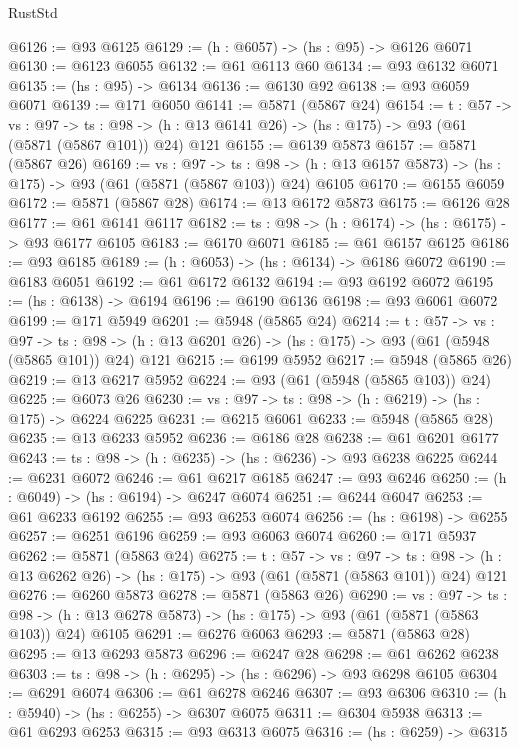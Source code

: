 \begin{lexlean}{RustStd}
\begin{coremodule}
@6126 := @93 @6125
@6129 := (h : @6057) -> (hs : @95) -> @6126 @6071
@6130 := @6123 @6055
@6132 := @61 @6113 @60
@6134 := @93 @6132 @6071
@6135 := (hs : @95) -> @6134
@6136 := @6130 @92
@6138 := @93 @6059 @6071
@6139 := @171 @6050
@6141 := @5871 (@5867 @24)
@6154 := {t : @57} ->
  {vs : @97} ->
  {ts : @98} -> (h : @13 @6141 @26) -> (hs : @175) -> @93 (@61 (@5871 (@5867 @101)) @24) @121
@6155 := @6139 @5873
@6157 := @5871 (@5867 @26)
@6169 := {vs : @97} ->
  {ts : @98} -> (h : @13 @6157 @5873) -> (hs : @175) -> @93 (@61 (@5871 (@5867 @103)) @24) @6105
@6170 := @6155 @6059
@6172 := @5871 (@5867 @28)
@6174 := @13 @6172 @5873
@6175 := @6126 @28
@6177 := @61 @6141 @6117
@6182 := {ts : @98} -> (h : @6174) -> (hs : @6175) -> @93 @6177 @6105
@6183 := @6170 @6071
@6185 := @61 @6157 @6125
@6186 := @93 @6185
@6189 := (h : @6053) -> (hs : @6134) -> @6186 @6072
@6190 := @6183 @6051
@6192 := @61 @6172 @6132
@6194 := @93 @6192 @6072
@6195 := (hs : @6138) -> @6194
@6196 := @6190 @6136
@6198 := @93 @6061 @6072
@6199 := @171 @5949
@6201 := @5948 (@5865 @24)
@6214 := {t : @57} ->
  {vs : @97} ->
  {ts : @98} -> (h : @13 @6201 @26) -> (hs : @175) -> @93 (@61 (@5948 (@5865 @101)) @24) @121
@6215 := @6199 @5952
@6217 := @5948 (@5865 @26)
@6219 := @13 @6217 @5952
@6224 := @93 (@61 (@5948 (@5865 @103)) @24)
@6225 := @6073 @26
@6230 := {vs : @97} -> {ts : @98} -> (h : @6219) -> (hs : @175) -> @6224 @6225
@6231 := @6215 @6061
@6233 := @5948 (@5865 @28)
@6235 := @13 @6233 @5952
@6236 := @6186 @28
@6238 := @61 @6201 @6177
@6243 := {ts : @98} -> (h : @6235) -> (hs : @6236) -> @93 @6238 @6225
@6244 := @6231 @6072
@6246 := @61 @6217 @6185
@6247 := @93 @6246
@6250 := (h : @6049) -> (hs : @6194) -> @6247 @6074
@6251 := @6244 @6047
@6253 := @61 @6233 @6192
@6255 := @93 @6253 @6074
@6256 := (hs : @6198) -> @6255
@6257 := @6251 @6196
@6259 := @93 @6063 @6074
@6260 := @171 @5937
@6262 := @5871 (@5863 @24)
@6275 := {t : @57} ->
  {vs : @97} ->
  {ts : @98} -> (h : @13 @6262 @26) -> (hs : @175) -> @93 (@61 (@5871 (@5863 @101)) @24) @121
@6276 := @6260 @5873
@6278 := @5871 (@5863 @26)
@6290 := {vs : @97} ->
  {ts : @98} -> (h : @13 @6278 @5873) -> (hs : @175) -> @93 (@61 (@5871 (@5863 @103)) @24) @6105
@6291 := @6276 @6063
@6293 := @5871 (@5863 @28)
@6295 := @13 @6293 @5873
@6296 := @6247 @28
@6298 := @61 @6262 @6238
@6303 := {ts : @98} -> (h : @6295) -> (hs : @6296) -> @93 @6298 @6105
@6304 := @6291 @6074
@6306 := @61 @6278 @6246
@6307 := @93 @6306
@6310 := (h : @5940) -> (hs : @6255) -> @6307 @6075
@6311 := @6304 @5938
@6313 := @61 @6293 @6253
@6315 := @93 @6313 @6075
@6316 := (hs : @6259) -> @6315

\end{coremodule}
\end{lexlean}
